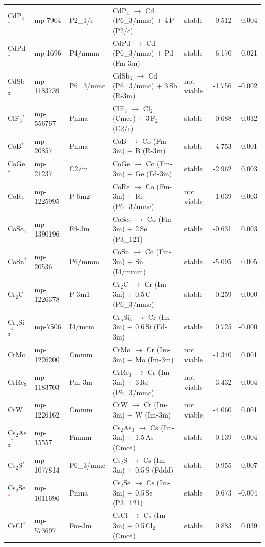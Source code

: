 \begin{longtable}{@{}ll l@{\hspace{4pt}} p{4.6cm} l@{\hspace{4pt}} rr@{}}
CdP$_{4}$$^*$ & mp-7904 & P2\_1/c & CdP$_{4}$ $\to$ Cd (P6\_3/mmc) $+$ 4\,P (P2/c) & stable & -0.512 & 0.004 \\
CdPd$^*$ & mp-1696 & P4/mmm & CdPd $\to$ Cd (P6\_3/mmc) $+$ Pd (Fm-3m) & stable & -6.170 & 0.021 \\
CdSb$_{3}$ & mp-1183739 & P6\_3/mmc & CdSb$_{3}$ $\to$ Cd (P6\_3/mmc) $+$ 3\,Sb (R-3m) & not viable & -1.756 & -0.002 \\
ClF$_{3}$\textcolor{red}{$^*$} & mp-556767 & Pnma & ClF$_{3}$ $\to$ Cl$_{2}$ (Cmce) $+$ 3\,F$_{2}$ (C2/c) & stable & 0.688 & 0.032 \\
CoB$^*$ & mp-20857 & Pnma & CoB $\to$ Co (Fm-3m) $+$ B (R-3m) & stable & -4.753 & 0.001 \\
CoGe$^*$ & mp-21237 & C2/m & CoGe $\to$ Co (Fm-3m) $+$ Ge (Fd-3m) & stable & -2.962 & 0.003 \\
CoRe & mp-1225995 & P-6m2 & CoRe $\to$ Co (Fm-3m) $+$ Re (P6\_3/mmc) & not viable & -1.039 & 0.003 \\
CoSe$_{2}$ & mp-1390196 & Fd-3m & CoSe$_{2}$ $\to$ Co (Fm-3m) $+$ 2\,Se (P3\_121) & stable & -0.631 & 0.003 \\
CoSn$^*$ & mp-20536 & P6/mmm & CoSn $\to$ Co (Fm-3m) $+$ Sn (I4/mmm) & stable & -5.095 & 0.005 \\
Cr$_{2}$C & mp-1226378 & P-3m1 & Cr$_{2}$C $\to$ Cr (Im-3m) $+$ 0.5\,C (P6\_3/mmc) & stable & -0.259 & -0.000 \\
Cr$_{5}$Si$_{3}$\textcolor{red}{$^*$} & mp-7506 & I4/mcm & Cr$_{5}$Si$_{3}$ $\to$ Cr (Im-3m) $+$ 0.6\,Si (Fd-3m) & stable & 0.725 & -0.000 \\
CrMo & mp-1226200 & Cmmm & CrMo $\to$ Cr (Im-3m) $+$ Mo (Im-3m) & not viable & -1.340 & 0.001 \\
CrRe$_{3}$ & mp-1183703 & Pm-3m & CrRe$_{3}$ $\to$ Cr (Im-3m) $+$ 3\,Re (P6\_3/mmc) & not viable & -3.432 & 0.004 \\
CrW & mp-1226162 & Cmmm & CrW $\to$ Cr (Im-3m) $+$ W (Im-3m) & not viable & -4.060 & 0.001 \\
Cs$_{2}$As$_{3}$$^*$ & mp-15557 & Fmmm & Cs$_{2}$As$_{3}$ $\to$ Cs (Im-3m) $+$ 1.5\,As (Cmce) & stable & -0.139 & -0.004 \\
Cs$_{2}$S\textcolor{red}{$^*$} & mp-1077814 & P6\_3/mmc & Cs$_{2}$S $\to$ Cs (Im-3m) $+$ 0.5\,S (Fddd) & stable & 0.955 & 0.007 \\
Cs$_{2}$Se\textcolor{red}{$^*$} & mp-1011696 & Pnma & Cs$_{2}$Se $\to$ Cs (Im-3m) $+$ 0.5\,Se (P3\_121) & stable & 0.673 & -0.004 \\
CsCl\textcolor{red}{$^*$} & mp-573697 & Fm-3m & CsCl $\to$ Cs (Im-3m) $+$ 0.5\,Cl$_{2}$ (Cmce) & stable & 0.883 & 0.039 \\

\end{longtable}
